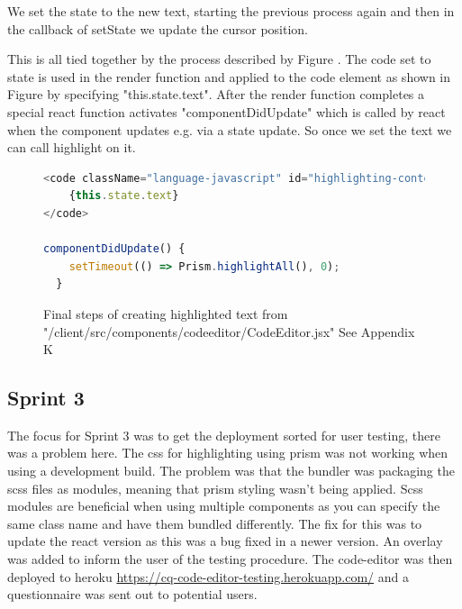 We set the state to the new text, starting the previous process again and then in the callback of setState \cite{reactSetState} 
we update the cursor position.
\newline

This is all tied together by the process described by Figure . The code set to state is used in the render function and applied 
to the code element as shown in Figure  by specifying "this.state.text". After the render function completes 
a special react function activates "componentDidUpdate" \cite{reactDidUpdate} which is called by react when the component updates e.g. via a state update. So once we set the text we can call 
highlight on it.

\begin{figure}[h]
    \begin{lstlisting}[language=Javascript]
<code className="language-javascript" id="highlighting-content">
    {this.state.text}
</code>

componentDidUpdate() {
    setTimeout(() => Prism.highlightAll(), 0);
  }

    \end{lstlisting}
    \caption{Final steps of creating highlighted text from  "/client/src/components/code\textunderscore{}editor/CodeEditor.jsx" See Appendix K}
    \label{fig:final-steps}
\end{figure}

\subsection{Sprint 3}
The focus for Sprint 3 was to get the deployment sorted for user testing, there was a problem here. The css for highlighting using prism was not working 
when using a development build. The problem was that the bundler was packaging the scss files as modules, meaning that prism styling wasn't being applied. 
Scss modules are beneficial when using multiple components as you can specify the same class name and have them bundled differently. The fix for this was to 
update the react version as this was a bug fixed in a newer version. An overlay was added to inform the user of the testing procedure.
The code-editor was then deployed to heroku 
\href{https://cq-code-editor-testing.herokuapp.com/}{https://cq-code-editor-testing.herokuapp.com/} and a questionnaire was sent out to potential users.

